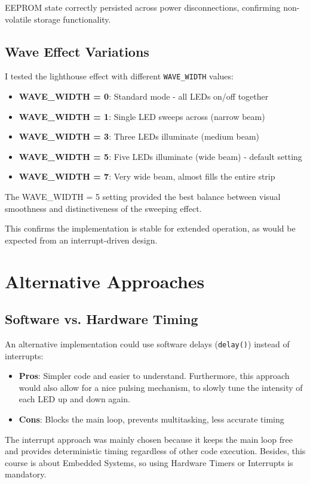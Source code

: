 \documentclass[report]{IEEEtran}
\begin{document}
EEPROM state correctly persisted across power disconnections, confirming non-volatile storage functionality.

\subsection{Wave Effect Variations}
I tested the lighthouse effect with different \texttt{WAVE\_WIDTH} values:
\begin{itemize}
    \item \textbf{WAVE\_WIDTH = 0}: Standard mode - all LEDs on/off together
    \item \textbf{WAVE\_WIDTH = 1}: Single LED sweeps across (narrow beam)
    \item \textbf{WAVE\_WIDTH = 3}: Three LEDs illuminate (medium beam)
    \item \textbf{WAVE\_WIDTH = 5}: Five LEDs illuminate (wide beam) - default setting
    \item \textbf{WAVE\_WIDTH = 7}: Very wide beam, almost fills the entire strip
\end{itemize}

The WAVE\_WIDTH = 5 setting provided the best balance between visual smoothness and distinctiveness of the sweeping effect.

This confirms the implementation is stable for extended operation, as would be expected from an interrupt-driven design.

\section{Alternative Approaches}

\subsection{Software vs. Hardware Timing}
An alternative implementation could use software delays (\texttt{delay()}) instead of interrupts:
\begin{itemize}
    \item \textbf{Pros}: Simpler code and easier to understand. Furthermore, this approach would also allow for a nice pulsing mechanism, to slowly tune the intensity of each LED up and down again. 
    \item \textbf{Cons}: Blocks the main loop, prevents multitasking, less accurate timing
\end{itemize}

The interrupt approach was mainly chosen because it keeps the main loop free and provides deterministic timing regardless of other code execution.
Besides, this course is about Embedded Systems, so using Hardware Timers or Interrupts is mandatory. 
\end{document}
